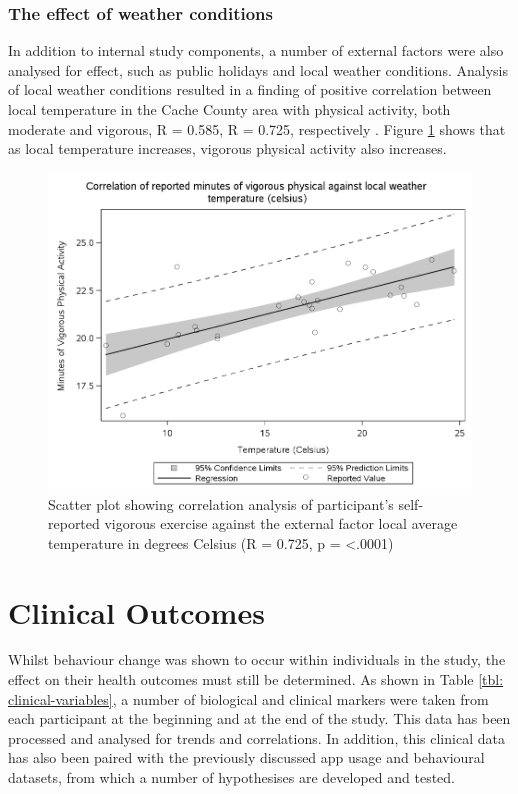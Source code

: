 \subsubsection{The effect of weather conditions}
In addition to internal study components, a number of external factors were also analysed for effect, such as public holidays and local weather conditions.
Analysis of local weather conditions resulted in a finding of positive correlation between local temperature in the Cache County area with physical activity, both moderate and vigorous, R = 0.585, R = 0.725, respectively \cite{Hartin2015-ICOST}. Figure \ref{fig: scatter-regression-temp-activity} shows that as local temperature increases, vigorous physical activity also increases.

\begin{figure}[h]
    \centering
    \includegraphics[scale=0.4, angle=0]{Files/prevention-study-3/figures/correlation-temp-activity}
    \caption{Scatter plot showing correlation analysis of participant’s self-reported vigorous exercise against the external factor local average temperature in degrees Celsius (R = 0.725, p = \textless.0001)}
    \label{fig: scatter-regression-temp-activity}
\end{figure}

\section{Clinical Outcomes}
Whilst behaviour change was shown to occur within individuals in the study, the effect on their health outcomes must still be determined. As shown in Table \ref{tbl: clinical-variables}, a number of biological and clinical markers were taken from each participant at the beginning and at the end of the study. This data has been processed and analysed for trends and correlations. In addition, this clinical data has also been paired with the previously discussed app usage and behavioural datasets, from which a number of hypothesises are developed and tested.


